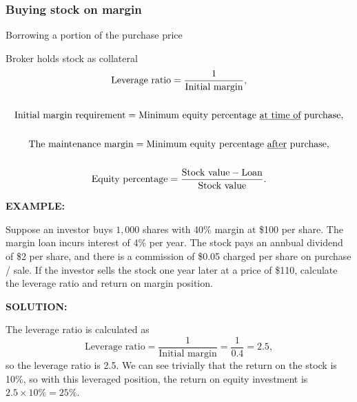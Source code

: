 \documentclass[../notes_compiled.tex]{subfiles}
\begin{document}
\subsubsection{Buying stock on margin}
\begin{itemize}
\item Borrowing a portion of the purchase price
\item Broker holds stock as collateral
\begin{gather}
\text{Leverage ratio} = \frac{1}{\text{Initial margin}}, \\ \nonumber \\
\text{Initial margin requirement} = \text{Minimum equity percentage \underline{at time of} purchase}, \\ \nonumber \\
\text{The maintenance margin} = \text{Minimum equity percentage \underline{after} purchase}, \\ \nonumber \\
\text{Equity percentage} = \frac{\text{Stock value}-\text{Loan}}{\text{Stock value}}.
\end{gather}

{\color{RedViolet}
\item[] \textbf{EXAMPLE:} 
\item[] Suppose an investor buys $1,000$ shares with 40\% margin at \$100 per share. The margin loan incurs interest of 4\% per year. The stock pays an annbual dividend of \$2 per share, and there is a commission of \$0.05 charged per share on purchase / sale. If the investor sells the stock one year later at a price of \$110, calculate the leverage ratio and return on margin position.
}
{\color{RoyalBlue}
\item[] \textbf{SOLUTION:}
\item[] The leverage ratio is calculated as
\begin{equation*}
\text{Leverage ratio} = \frac{1}{\text{Initial margin}} = \frac{1}{0.4} = 2.5,
\end{equation*}
so the leverage ratio is 2.5. We can see trivially that the return on the stock is 10\%, so with this leveraged position, the return on equity investment is $2.5\times10\%=25\%$.

}
\end{itemize}
\end{document}
